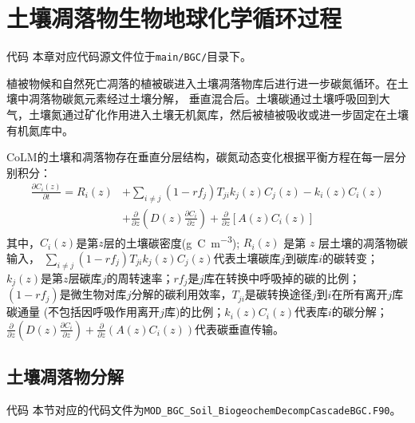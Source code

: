 \chapter{土壤凋落物生物地球化学循环过程}\label{土壤凋落物生物地球化学循环过程}
\begin{mymdframed}{代码}
本章对应代码源文件位于\texttt{main/BGC/}目录下。
\end{mymdframed}

植被物候和自然死亡凋落的植被碳进入土壤凋落物库后进行进一步碳氮循环。在土壤中凋落物碳氮元素经过土壤分解，
垂直混合后。土壤碳通过土壤呼吸回到大气，土壤氮通过矿化作用进入土壤无机氮库，然后被植被吸收或进一步固定在土壤有机氮库中。

CoLM的土壤和凋落物存在垂直分层结构，碳氮动态变化根据平衡方程在每一层分别积分：
\begin{equation}
\begin{aligned}
\frac{\partial C_{i}(z)}{\partial t}=R_{i}(z) &+\sum_{i \neq j}\left(1-r f_{j}\right) T_{j i} k_{j}(z) C_{j}(z)-k_{i}(z) C_{i}(z) \\
&+\frac{\partial}{\partial z}\left(D(z) \frac{\partial C_{i}}{\partial z}\right)+\frac{\partial}{\partial z}\left[A(z) C_{i}(z)\right]
\end{aligned}
\end{equation}
其中，$C_i\left(z\right)$是第$z$层的土壤碳密度(\unit{g.C.m^{-3}}); $R_i (z)$ 是第 $z$ 层土壤的凋落物碳输入，
$\sum_{i\neq j}{\left(1-{rf}_j\right)T_{ji}k_j\left(z\right)C_j\left(z\right)}$代表土壤碳库$j$到碳库$i$的碳转变；
$k_j\left(z\right)$是第$z$层碳库$j$的周转速率；${rf}_j$是$j$库在转换中呼吸掉的碳的比例；
$\left(1-{rf}_j\right)$是微生物对库$j$分解的碳利用效率，$T_{ji}$是碳转换途径$j$到$i$在所有离开$j$库碳通量
(不包括因呼吸作用离开$j$库)的比例；$k_i\left(z\right)C_i\left(z\right)$代表库$i$的碳分解；
$\frac{\partial}{\partial z}\left(D\left(z\right)\frac{\partial C_i}{\partial z}\right)+\frac{\partial}{\partial z}\left(A\left(z\right)C_i\left(z\right)\right)$代表碳垂直传输。


\section{土壤凋落物分解}\label{土壤凋落物分解}

\begin{mymdframed}{代码}
本节对应的代码文件为\texttt{MOD\_BGC\_Soil\_BiogeochemDecompCascadeBGC.F90}。
\end{mymdframed}

